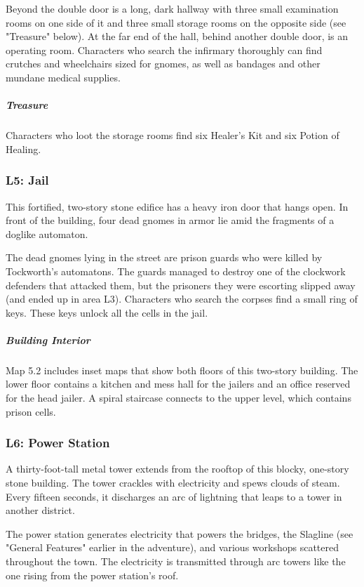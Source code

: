 \documentclass[10pt,a4paper,twoside,bg=print,twocolumn,openany,nodeprecatedcode]{dndbook}
\begin{document}
Beyond the double door is a long, dark hallway with three small examination rooms on one side of it and three small storage rooms on the opposite side (see "Treasure" below). At the far end of the hall, behind another double door, is an operating room. Characters who search the infirmary thoroughly can find crutches and wheelchairs sized for gnomes, as well as bandages and other mundane medical supplies.

\subparagraph{Treasure}
Characters who loot the storage rooms find six Healer's Kit and six Potion of Healing.

\subsubsection{L5: Jail}
\begin{DndReadAloud}{}
This fortified, two-story stone edifice has a heavy iron door that hangs open. In front of the building, four dead gnomes in armor lie amid the fragments of a doglike automaton.

\end{DndReadAloud}

The dead gnomes lying in the street are prison guards who were killed by Tockworth's automatons. The guards managed to destroy one of the clockwork defenders that attacked them, but the prisoners they were escorting slipped away (and ended up in area L3). Characters who search the corpses find a small ring of keys. These keys unlock all the cells in the jail.

\subparagraph{Building Interior}
Map 5.2 includes inset maps that show both floors of this two-story building. The lower floor contains a kitchen and mess hall for the jailers and an office reserved for the head jailer. A spiral staircase connects to the upper level, which contains prison cells.

\subsubsection{L6: Power Station}
\begin{DndReadAloud}{}
A thirty-foot-tall metal tower extends from the rooftop of this blocky, one-story stone building. The tower crackles with electricity and spews clouds of steam. Every fifteen seconds, it discharges an arc of lightning that leaps to a tower in another district.

\end{DndReadAloud}

The power station generates electricity that powers the bridges, the Slagline (see "General Features" earlier in the adventure), and various workshops scattered throughout the town. The electricity is transmitted through arc towers like the one rising from the power station's roof.
\end{document}
